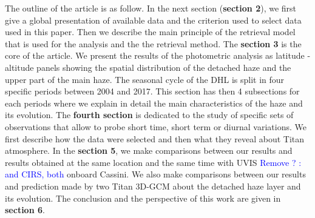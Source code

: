 The outline of the article is as follow. In the next section (\textbf{section 2}), we first give a global presentation of
available data and the criterion used to select data used in this paper.  Then we describe the main principle of the
retrieval model that is used for the analysis and the the retrieval method. The \textbf{section 3} is the core of the
article. We present the results of the photometric analysis as latitude - altitude panels showing the spatial distribution
of the detached haze and the upper part of the main haze. The seasonal cycle of the DHL is split in four specific
periods between 2004 and 2017. This section has then 4 subsections for each periods where we explain in detail the main
characteristics of the haze and its evolution. The \textbf{fourth section} is dedicated to the study of specific sets of
observations that allow to probe short time, short term or diurnal variations. We first describe how the data were selected
and then what they reveal about Titan atmosphere. In the \textbf{section 5}, we make comparisons between our results and
results obtained at the same location and the same time with UVIS \textcolor{blue}{Remove ? : and CIRS, both} onboard Cassini. We
also make comparisons between our results and prediction made by two Titan 3D-GCM about the detached haze layer and its evolution.
The conclusion and the perspective of this work are given in \textbf{section 6}.
